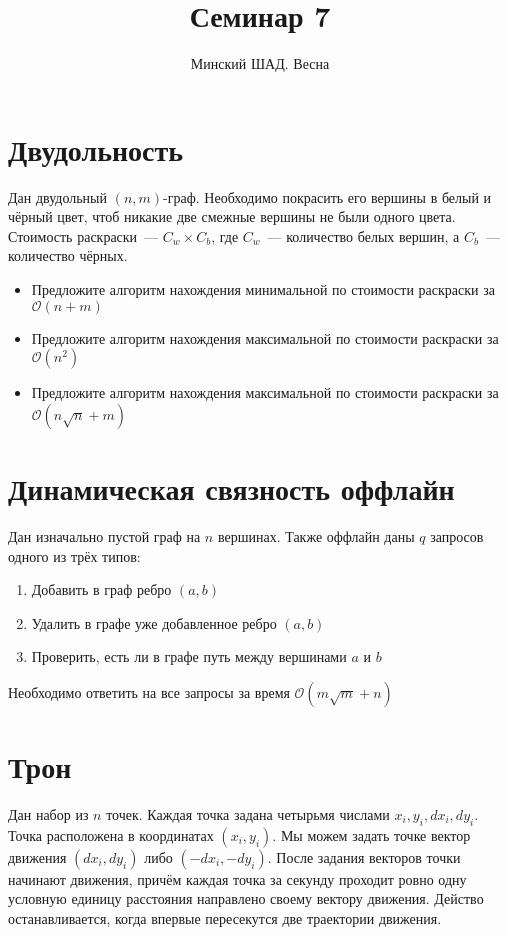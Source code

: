 \documentclass[addpoints]{exam}
\title{Семинар 7}
\author{Минский ШАД. Весна}
\begin{document}
\maketitle

\section{Двудольность}

Дан двудольный $(n,m)$-граф. Необходимо покрасить его вершины в белый и чёрный цвет, чтоб никакие две смежные вершины не были одного цвета. Стоимость раскраски~--- $C_w \times C_b$, где $C_w$~--- количество белых вершин, а $C_b$~--- количество чёрных.

\begin{itemize}
\item Предложите алгоритм нахождения минимальной по стоимости раскраски за $\mathcal{O}(n + m)$
\item Предложите алгоритм нахождения максимальной по стоимости раскраски за $\mathcal{O}(n^2)$
\item Предложите алгоритм нахождения максимальной по стоимости раскраски за $\mathcal{O}(n \sqrt{n} + m)$

\end{itemize}

\section{Динамическая связность оффлайн}

Дан изначально пустой граф на $n$ вершинах. Также оффлайн даны $q$ запросов одного из трёх типов:

\begin{enumerate}
\item Добавить в граф ребро $(a,b)$
\item Удалить в графе уже добавленное ребро $(a,b)$
\item Проверить, есть ли в графе путь между вершинами $a$ и $b$
\end{enumerate}

Необходимо ответить на все запросы за время $\mathcal{O}(m \sqrt{m} + n)$

\section{Трон}

Дан набор из $n$ точек. Каждая точка задана четырьмя числами $x_i, y_i, dx_i, dy_i$. Точка расположена в координатах $(x_i,y_i)$. Мы можем задать точке вектор движения $(dx_i, dy_i)$ либо $(-dx_i, -dy_i)$. После задания векторов точки начинают движения, причём каждая точка за секунду проходит ровно одну условную единицу расстояния направлено своему вектору движения. Действо останавливается, когда впервые пересекутся две траектории движения.
\end{document}
